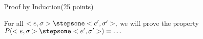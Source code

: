 \documentclass{article}
\begin{document}
%
%
%

\newpage
\begin{question}{Proof by Induction}{(25 points)}


  
  \begin{subquestion}
  \end{subquestion}

  \begin{subquestion}
    For all $<e,\sigma> \stepsone <e',\sigma'>$, we will prove the property $P(<e,\sigma> \stepsone <e',\sigma'>) = \dots$
  \end{subquestion}

  \begin{subquestion}

    
  \end{subquestion}

\end{question}





%
%
%
\end{document}
